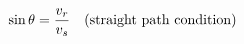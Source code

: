 \documentclass[preview]{standalone}
\begin{document}
\begin{align*}
\special{dvisvgm:raw <g id='unique000'>}\sin\theta = \frac{v_r}{v_s} \quad \text{(straight path condition)}\special{dvisvgm:raw </g>}
\end{align*}
\end{document}
